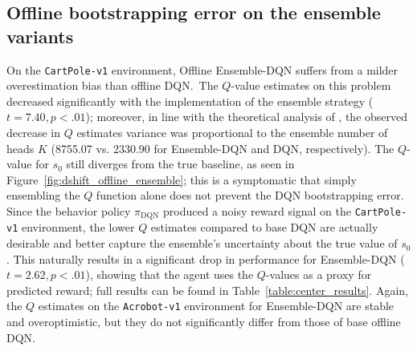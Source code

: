 \subsection{Offline bootstrapping error on the ensemble variants}
On the \texttt{CartPole-v1} environment, Offline Ensemble-DQN suffers
from a milder overestimation bias than offline DQN.\ The $Q$-value
estimates on this problem decreased significantly with the
implementation of the ensemble strategy ($t=7.40,p<.01$); moreover, in
line with the theoretical analysis of \citet{anschel2017averaged}, the
observed decrease in $Q$ estimates variance was proportional to the
ensemble number of heads $K$ (8755.07 vs. 2330.90 for Ensemble-DQN and
DQN, respectively). The $Q$-value for $s_0$ still diverges from the
true baseline, as seen in Figure~\ref{fig:dshift_offline_ensemble};
this is a symptomatic that simply ensembling the $Q$ function alone
does not prevent the DQN bootstrapping error. Since the behavior
policy $\pi_{\textrm{DQN}}$ produced a noisy reward signal on the
\texttt{CartPole-v1} environment, the lower $Q$ estimates compared to
base DQN are actually desirable and better capture the ensemble's
uncertainty about the true value of $s_0$. This naturally results in a
significant drop in performance for Ensemble-DQN ($t=2.62,p<.01$),
showing that the agent uses the $Q$-values as a proxy for predicted
reward; full results can be found in
Table~\ref{table:center_results}. Again, the $Q$
estimates on the \texttt{Acrobot-v1} environment for Ensemble-DQN are
stable and overoptimistic, but they do not significantly differ from
those of base offline DQN.\

